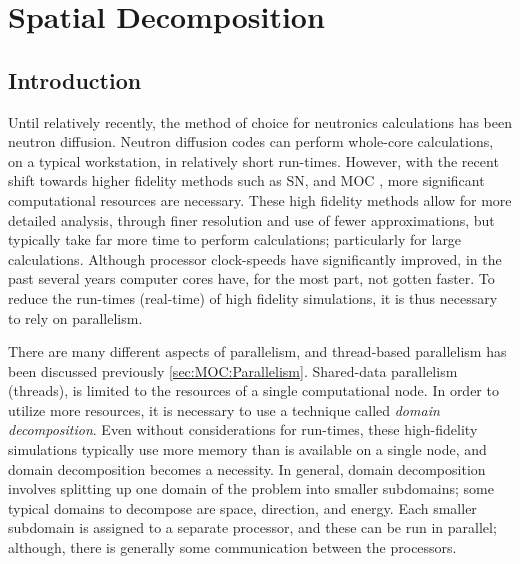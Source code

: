 \chapter{Spatial Decomposition}{\label{ch:Spatial Decomposition}
  \def\figpath{chapters/SpatialDecomposition/figures/}
  \graphicspath{ {\figpath} }
  \newcommand{\resultwidth}{0.85\linewidth}
  \section{Introduction}{\label{sec:Spatial Decomposition:Introduction}
    Until relatively recently, the method of choice for neutronics calculations has been neutron diffusion.
    Neutron diffusion codes can perform whole-core calculations, on a typical workstation, in relatively short run-times.
    However, with the recent shift towards higher fidelity methods such as \ac{SN}, and \ac{MOC} \cite{Askew1972}, more significant computational resources are necessary.
    These high fidelity methods allow for more detailed analysis, through finer resolution and use of fewer approximations, but typically take far more time to perform calculations; particularly for large calculations.
    Although processor clock-speeds have significantly improved, in the past several years computer cores have, for the most part, not gotten faster.
    To reduce the run-times (real-time) of high fidelity simulations, it is thus necessary to rely on parallelism.

    There are many different aspects of parallelism, and thread-based parallelism has been discussed previously \cref{sec:MOC:Parallelism}.
    Shared-data parallelism (threads), is limited to the resources of a single computational node.
    In order to utilize more resources, it is necessary to use a technique called \emph{domain decomposition}.
    Even without considerations for run-times, these high-fidelity simulations typically use more memory than is available on a single node, and domain decomposition becomes a necessity.
    In general, domain decomposition involves splitting up one domain of the problem into smaller subdomains; some typical domains to decompose are space, direction, and energy.
    Each smaller subdomain is assigned to a separate processor, and these can be run in parallel; although, there is generally some communication between the processors.

}}
